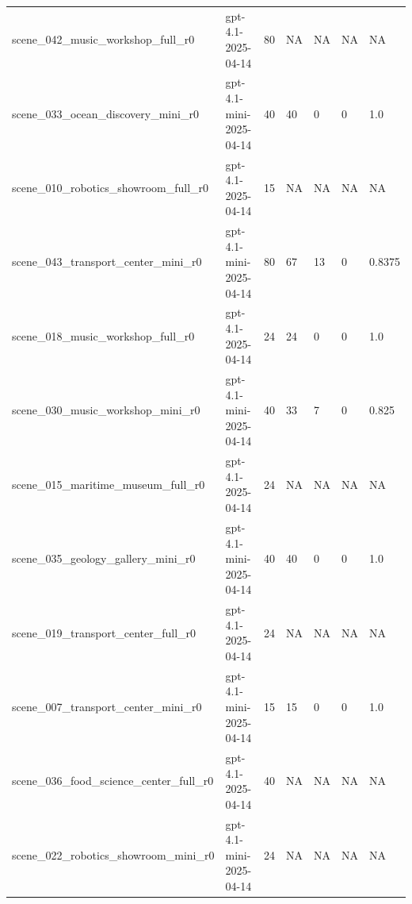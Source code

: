 \begin{tabular}{lllllll}
scene\_042\_music\_workshop\_full\_r0 & gpt-4.1-2025-04-14 & 80 & NA & NA & NA & NA \\
scene\_033\_ocean\_discovery\_mini\_r0 & gpt-4.1-mini-2025-04-14 & 40 & 40 & 0 & 0 & 1.0 \\
scene\_010\_robotics\_showroom\_full\_r0 & gpt-4.1-2025-04-14 & 15 & NA & NA & NA & NA \\
scene\_043\_transport\_center\_mini\_r0 & gpt-4.1-mini-2025-04-14 & 80 & 67 & 13 & 0 & 0.8375 \\
scene\_018\_music\_workshop\_full\_r0 & gpt-4.1-2025-04-14 & 24 & 24 & 0 & 0 & 1.0 \\
scene\_030\_music\_workshop\_mini\_r0 & gpt-4.1-mini-2025-04-14 & 40 & 33 & 7 & 0 & 0.825 \\
scene\_015\_maritime\_museum\_full\_r0 & gpt-4.1-2025-04-14 & 24 & NA & NA & NA & NA \\
scene\_035\_geology\_gallery\_mini\_r0 & gpt-4.1-mini-2025-04-14 & 40 & 40 & 0 & 0 & 1.0 \\
scene\_019\_transport\_center\_full\_r0 & gpt-4.1-2025-04-14 & 24 & NA & NA & NA & NA \\
scene\_007\_transport\_center\_mini\_r0 & gpt-4.1-mini-2025-04-14 & 15 & 15 & 0 & 0 & 1.0 \\
scene\_036\_food\_science\_center\_full\_r0 & gpt-4.1-2025-04-14 & 40 & NA & NA & NA & NA \\
scene\_022\_robotics\_showroom\_mini\_r0 & gpt-4.1-mini-2025-04-14 & 24 & NA & NA & NA & NA \\
\bottomrule
\end{tabular}
